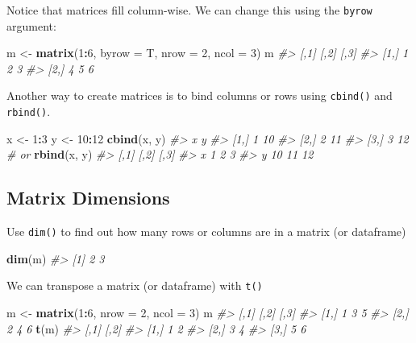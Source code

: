 \documentclass[]{book}
\newenvironment{Shaded}{\begin{snugshade}}{\end{snugshade}}
\newcommand{\KeywordTok}[1]{\textcolor[rgb]{0.13,0.29,0.53}{\textbf{#1}}}
\newcommand{\DataTypeTok}[1]{\textcolor[rgb]{0.13,0.29,0.53}{#1}}
\newcommand{\DecValTok}[1]{\textcolor[rgb]{0.00,0.00,0.81}{#1}}
\newcommand{\StringTok}[1]{\textcolor[rgb]{0.31,0.60,0.02}{#1}}
\newcommand{\CommentTok}[1]{\textcolor[rgb]{0.56,0.35,0.01}{\textit{#1}}}
\newcommand{\OperatorTok}[1]{\textcolor[rgb]{0.81,0.36,0.00}{\textbf{#1}}}
\newcommand{\NormalTok}[1]{#1}
\begin{document}
Notice that matrices fill column-wise. We can change this using the
\texttt{byrow} argument:

\begin{Shaded}
\begin{Highlighting}[]
\NormalTok{m <-}\StringTok{ }\KeywordTok{matrix}\NormalTok{(}\DecValTok{1}\OperatorTok{:}\DecValTok{6}\NormalTok{, }\DataTypeTok{byrow =}\NormalTok{ T, }\DataTypeTok{nrow =} \DecValTok{2}\NormalTok{, }\DataTypeTok{ncol =} \DecValTok{3}\NormalTok{)}
\NormalTok{m}
\CommentTok{#>      [,1] [,2] [,3]}
\CommentTok{#> [1,]    1    2    3}
\CommentTok{#> [2,]    4    5    6}
\end{Highlighting}
\end{Shaded}

Another way to create matrices is to bind columns or rows using
\texttt{cbind()} and \texttt{rbind()}.

\begin{Shaded}
\begin{Highlighting}[]
\NormalTok{x <-}\StringTok{ }\DecValTok{1}\OperatorTok{:}\DecValTok{3}
\NormalTok{y <-}\StringTok{ }\DecValTok{10}\OperatorTok{:}\DecValTok{12}
\KeywordTok{cbind}\NormalTok{(x, y)}
\CommentTok{#>      x  y}
\CommentTok{#> [1,] 1 10}
\CommentTok{#> [2,] 2 11}
\CommentTok{#> [3,] 3 12}
\CommentTok{# or }
\KeywordTok{rbind}\NormalTok{(x, y)}
\CommentTok{#>   [,1] [,2] [,3]}
\CommentTok{#> x    1    2    3}
\CommentTok{#> y   10   11   12}
\end{Highlighting}
\end{Shaded}

\subsection{Matrix Dimensions}\label{matrix-dimensions}

Use \texttt{dim()} to find out how many rows or columns are in a matrix
(or dataframe)

\begin{Shaded}
\begin{Highlighting}[]
\KeywordTok{dim}\NormalTok{(m)}
\CommentTok{#> [1] 2 3}
\end{Highlighting}
\end{Shaded}

We can transpose a matrix (or dataframe) with \texttt{t()}

\begin{Shaded}
\begin{Highlighting}[]
\NormalTok{m <-}\StringTok{ }\KeywordTok{matrix}\NormalTok{(}\DecValTok{1}\OperatorTok{:}\DecValTok{6}\NormalTok{, }\DataTypeTok{nrow =} \DecValTok{2}\NormalTok{, }\DataTypeTok{ncol =} \DecValTok{3}\NormalTok{)}
\NormalTok{m}
\CommentTok{#>      [,1] [,2] [,3]}
\CommentTok{#> [1,]    1    3    5}
\CommentTok{#> [2,]    2    4    6}
\KeywordTok{t}\NormalTok{(m)}
\CommentTok{#>      [,1] [,2]}
\CommentTok{#> [1,]    1    2}
\CommentTok{#> [2,]    3    4}
\CommentTok{#> [3,]    5    6}
\end{Highlighting}
\end{Shaded}
\end{document}
